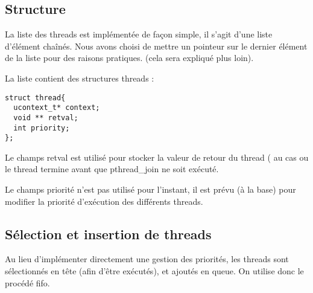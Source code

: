 \subsection*{Structure}
La liste des threads est implémentée de façon simple, il s'agit d'une liste d'élément chaînés. Nous avons choisi de mettre un pointeur sur le dernier élément de la liste pour des raisons pratiques. (cela sera expliqué plus loin).

La liste contient des structures threads :
\begin{verbatim}
struct thread{
  ucontext_t* context;
  void ** retval;
  int priority;
};
\end{verbatim}
Le champs retval est utilisé pour stocker la valeur de retour du thread ( au cas ou le thread termine avant que pthread\_join ne soit exécuté.

Le champs priorité n'est pas utilisé pour l'instant, il est prévu (à la base) pour modifier la priorité d'exécution des différents threads.

\subsection*{Sélection et insertion de threads}
Au lieu d'implémenter directement une gestion des priorités, les threads sont sélectionnés en tête (afin d'être exécutés), et ajoutés en queue. On utilise donc le procédé fifo.
